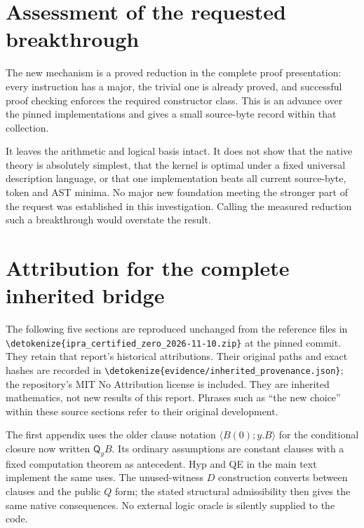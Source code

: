 \documentclass[11pt,letterpaper]{article}
\theoremstyle{definition}\newtheorem{definition}[theorem]{Definition}
\theoremstyle{remark}\newtheorem{remark}[theorem]{Remark}
\newcommand{\Q}{\mathsf Q}
\newcommand{\file}[1]{\expandafter\nolinkurl\expandafter{\detokenize{#1}}}
\begin{document}
\section{Assessment of the requested breakthrough}

The new mechanism is a proved reduction in the complete proof
presentation: every instruction has a major, the trivial one is already
proved, and successful proof checking enforces the required constructor
class. This is an advance over the pinned implementations and gives a
small source-byte record within that collection.

It leaves the arithmetic and logical basis intact. It does not show
that the native theory is absolutely simplest, that the kernel is
optimal under a fixed universal description language, or that one
implementation beats all current source-byte, token and AST minima.
No major new foundation meeting the stronger part of the request was
established in this investigation. Calling the measured reduction such
a breakthrough would overstate the result.

\appendix
\clearpage
\section*{Attribution for the complete inherited bridge}
The following five sections are reproduced unchanged from the reference
files in \file{ipra_certified_zero_2026-11-10.zip} at the pinned commit.
They retain that report's historical attributions. Their original paths
and exact hashes are recorded in \file{evidence/inherited_provenance.json};
the repository's MIT No Attribution license is included. They are
inherited mathematics, not new results of this report. Phrases such as
``the new choice'' within these source sections refer to their original
development.

The first appendix uses the older clause notation
\(\langle B(0);y.B\rangle\) for the conditional closure now written
\(\Q_yB\). Its ordinary assumptions are constant clauses with a fixed
computation theorem as antecedent. Hyp and QE in the main text implement
the same uses. The unused-witness \(D\) construction converts between
clauses and the public \(Q\) form; the stated structural admissibility
then gives the same native consequences. No external logic oracle is
silently supplied to the code.






\end{document}
